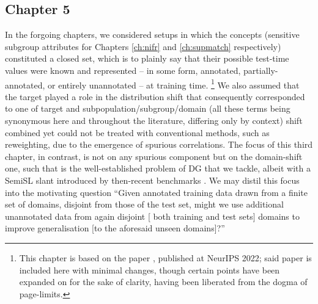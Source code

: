 \subsection*{Chapter 5}%
%
In the forgoing chapters, we considered setups in which the concepts (sensitive subgroup attributes
for Chapters \ref{ch:nifr} and \ref{ch:supmatch} respectively) constituted a closed set, which is
to plainly say that their possible test-time values were known and represented -- in some form,
annotated, partially-annotated, or entirely unannotated -- at training time.
%
\footnote{
    This chapter is based on the paper \citet{bartlett2022okapi}, published at NeurIPS 2022; said
    paper is included here with minimal changes, though certain points have been expanded on for
    the sake of clarity, having been liberated from the dogma of page-limits.
}
%
We also assumed that the target played a role in the distribution shift that consequently
corresponded to one of target and subpopulation/subgroup/domain (all these terms being synonymous
here and throughout the literature, differing only by context) shift combined yet could not be
treated with conventional methods, such as reweighting, due to the emergence of spurious
correlations.
%
The focus of this third chapter, in contrast, is not on any spurious component but on the
domain-shift one, such that is the well-established problem of \ac{DG} that we tackle, albeit with
a \ac{SemiSL} slant introduced by then-recent benchmarks \citep{SagWeiLeeGaoetal22}. 
%
We may distil this focus into the motivating question ``Given annotated training data drawn from a
finite set of domains, disjoint from those of the test set, might we use additional unannotated
data from again disjoint [\wrt{} both training and test sets] domains to improve generalisation [to
the aforesaid unseen domains]?''
%

